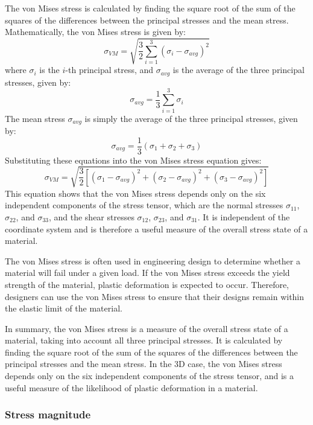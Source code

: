 The von Mises stress is calculated by finding the square root of the sum of the squares of the differences between the principal stresses and the mean stress. Mathematically, the von Mises stress is given by:
\begin{equation}
    \sigma_{VM} = \sqrt{\frac{3}{2}\sum_{i=1}^{3}(\sigma_i-\sigma_{avg})^2}
\end{equation}
where $\sigma_i$ is the $i$-th principal stress, and $\sigma_{avg}$ is the average of the three principal stresses, given by:
\begin{equation}
    \sigma_{avg} = \frac{1}{3}\sum_{i=1}^{3}\sigma_i
\end{equation}
The mean stress $\sigma_{avg}$ is simply the average of the three principal stresses, given by:
\begin{equation}
    \sigma_{avg} = \frac{1}{3}(\sigma_1 + \sigma_2 + \sigma_3)
\end{equation}
Substituting these equations into the von Mises stress equation gives:
\begin{equation}
    \sigma_{VM} = \sqrt{\frac{3}{2}\left[(\sigma_1-\sigma_{avg})^2 + (\sigma_2-\sigma_{avg})^2 + (\sigma_3-\sigma_{avg})^2\right]}
\end{equation}
This equation shows that the von Mises stress depends only on the six independent components of the stress tensor, which are the normal stresses $\sigma_{11}$, $\sigma_{22}$, and $\sigma_{33}$, and the shear stresses $\sigma_{12}$, $\sigma_{23}$, and $\sigma_{31}$. It is independent of the coordinate system and is therefore a useful measure of the overall stress state of a material.

The von Mises stress is often used in engineering design to determine whether a material will fail under a given load. If the von Mises stress exceeds the yield strength of the material, plastic deformation is expected to occur. Therefore, designers can use the von Mises stress to ensure that their designs remain within the elastic limit of the material.

In summary, the von Mises stress is a measure of the overall stress state of a material, taking into account all three principal stresses. It is calculated by finding the square root of the sum of the squares of the differences between the principal stresses and the mean stress. In the 3D case, the von Mises stress depends only on the six independent components of the stress tensor, and is a useful measure of the likelihood of plastic deformation in a material.
\subsubsection{Stress magnitude}
